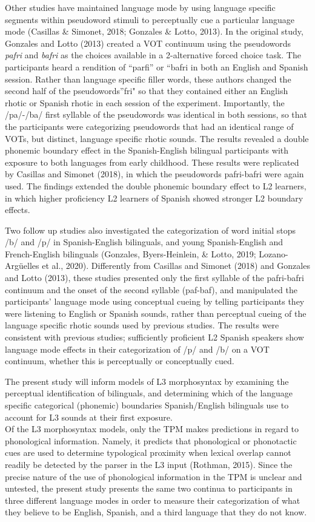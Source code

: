 \documentclass[
  english,
  man]{apa6}
\begin{document}
Other studies have maintained language mode by using language specific segments within pseudoword stimuli to perceptually cue a particular language mode (Casillas \& Simonet, 2018; Gonzales \& Lotto, 2013). In the original study, Gonzales and Lotto (2013) created a VOT continuum using the pseudowords \emph{pafri} and \emph{bafri} as the choices available in a 2-alternative forced choice task. The participants heard a rendition of ``parfi'' or ``bafri in both an English and Spanish session. Rather than language specific filler words, these authors changed the second half of the pseudowords''fri" so that they contained either an English rhotic or Spanish rhotic in each session of the experiment. Importantly, the /pa/-/ba/ first syllable of the pseudowords was identical in both sessions, so that the participants were categorizing pseudowords that had an identical range of VOTs, but distinct, language specific rhotic sounds. The results revealed a double phonemic boundary effect in the Spanish-English bilingual participants with exposure to both languages from early childhood. These results were replicated by Casillas and Simonet (2018), in which the pseudowords pafri-bafri were again used. The findings extended the double phonemic boundary effect to L2 learners, in which higher proficiency L2 learners of Spanish showed stronger L2 boundary effects.

Two follow up studies also investigated the categorization of word initial stops /b/ and /p/ in Spanish-English bilinguals, and young Spanish-English and French-English bilinguals (Gonzales, Byers-Heinlein, \& Lotto, 2019; Lozano-Argüelles et al., 2020).
Differently from Casillas and Simonet (2018) and Gonzales and Lotto (2013), these studies presented only the first syllable of the pafri-bafri continuum and the onset of the second syllable (paf-baf), and manipulated the participants' language mode using conceptual cueing by telling participants they were listening to English or Spanish sounds, rather than perceptual cueing of the language specific rhotic sounds used by previous studies.
The results were consistent with previous studies; sufficiently proficient L2 Spanish speakers show language mode effects in their categorization of /p/ and /b/ on a VOT continuum, whether this is perceptually or conceptually cued.

The present study will inform models of L3 morphosyntax by examining the perceptual identification of bilinguals, and determining which of the language specific categorical (phonemic) boundaries Spanish/English bilinguals use to account for L3 sounds at their first exposure.\\
Of the L3 morphosyntax models, only the TPM makes predictions in regard to phonological information.
Namely, it predicts that phonological or phonotactic cues are used to determine typological proximity when lexical overlap cannot readily be detected by the parser in the L3 input (Rothman, 2015).
Since the precise nature of the use of phonological information in the TPM is unclear and untested, the present study presents the same two continua to participants in three different language modes in order to measure their categorization of what they believe to be English, Spanish, and a third language that they do not know.
\end{document}
